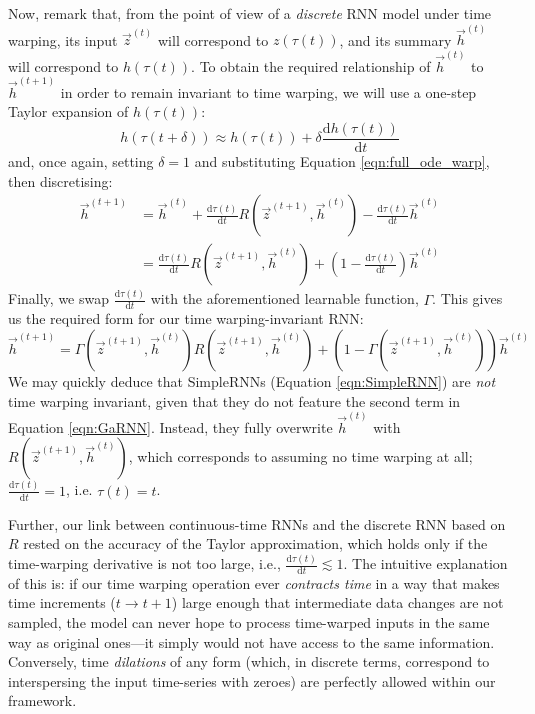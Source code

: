 Now, remark that, from the point of view of a \emph{discrete} RNN model under time warping, its input $\vec{z}^{(t)}$ will correspond to $z(\tau(t))$, and its summary $\vec{h}^{(t)}$ will correspond to $h(\tau(t))$. To obtain the required relationship of $\vec{h}^{(t)}$ to $\vec{h}^{(t+1)}$ in order to remain invariant to time warping, we will use a one-step Taylor expansion of $h(\tau(t))$:
\begin{equation*}
    h(\tau(t + \delta)) \approx h(\tau(t)) + \delta\frac{\mathrm{d}h(\tau(t))}{\mathrm{d}t}
\end{equation*}
and, once again, setting $\delta=1$ and substituting Equation \ref{eqn:full_ode_warp}, then discretising:
\begin{align*}
    \vec{h}^{(t+1)} &= \vec{h}^{(t)} + \frac{\mathrm{d}\tau(t)}{\mathrm{d}t}R(\vec{z}^{(t+1)}, \vec{h}^{(t)}) - \frac{\mathrm{d}\tau(t)}{\mathrm{d}t}\vec{h}^{(t)}\\
    &= \frac{\mathrm{d}\tau(t)}{\mathrm{d}t}R(\vec{z}^{(t+1)}, \vec{h}^{(t)}) + \left(1 - \frac{\mathrm{d}\tau(t)}{\mathrm{d}t}\right)\vec{h}^{(t)}
\end{align*}
Finally, we swap $\frac{\mathrm{d}\tau(t)}{\mathrm{d}t}$ with the aforementioned learnable function, $\Gamma$. This gives us the required form for our time warping-invariant RNN:
\begin{equation}\label{eqn:GaRNN}
    \vec{h}^{(t+1)} = \Gamma(\vec{z}^{(t+1)}, \vec{h}^{(t)})R(\vec{z}^{(t+1)}, \vec{h}^{(t)}) + (1 - \Gamma(\vec{z}^{(t+1)}, \vec{h}^{(t)}))\vec{h}^{(t)}
\end{equation}
We may quickly deduce that SimpleRNNs (Equation \ref{eqn:SimpleRNN}) are \emph{not} time warping invariant, given that they do not feature the second term in Equation \ref{eqn:GaRNN}. Instead, they fully overwrite $\vec{h}^{(t)}$ with $R(\vec{z}^{(t+1)}, \vec{h}^{(t)})$, which corresponds to assuming no time warping at all; $\frac{\mathrm{d}\tau(t)}{\mathrm{d}t} = 1$, i.e. $\tau(t) = t$.

Further, our link between continuous-time RNNs and the discrete RNN based on $R$ rested on the accuracy of the Taylor approximation, which holds only if the time-warping derivative is not too large, i.e., $\frac{\mathrm{d}\tau(t)}{\mathrm{d}t}\lesssim 1$. The intuitive explanation of this is: if our time warping operation ever \emph{contracts time} in a way that makes time increments ($t \rightarrow t + 1$) large enough that intermediate data changes are not sampled, the model can never hope to process time-warped inputs in the same way as original ones---it simply would not have access to the same information. Conversely, time \emph{dilations} of any form (which, in discrete terms, correspond to interspersing the input time-series with zeroes) are perfectly allowed within our framework.

